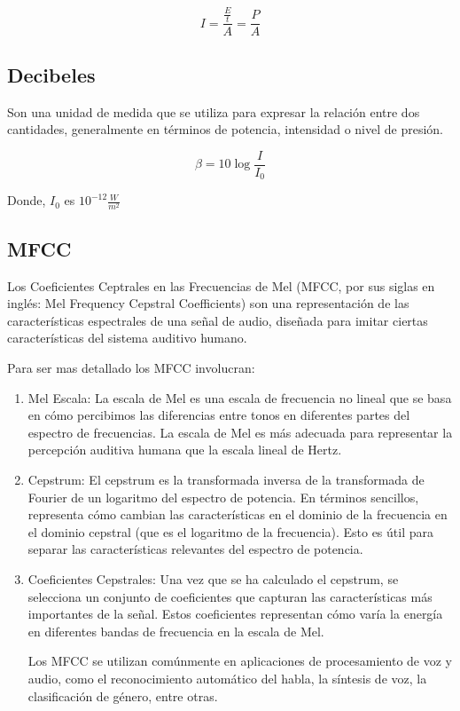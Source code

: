 \documentclass[letterpaper, 12pt]{article}
\begin{document}
\begin{equation}
	I = \frac{\frac{E}{t}}{A} = \frac{P}{A}
\end{equation}

\subsection*{Decibeles}

Son una unidad de medida que se utiliza para expresar la
relación entre dos cantidades, generalmente en términos de
potencia, intensidad o nivel de presión.

\begin{equation}
	\beta = 10 \log \frac{I}{I_{0}}
\end{equation}

Donde, $I_{0}$ es $10^{-12} \frac{W}{m^{2}}$

\subsection*{MFCC~\cite{mfcc}}

Los Coeficientes Ceptrales en las Frecuencias de Mel (MFCC,
por sus siglas en inglés: Mel Frequency Cepstral
Coefficients) son una representación de las características
espectrales de una señal de audio, diseñada para imitar
ciertas características del sistema auditivo humano.

Para ser mas detallado los MFCC involucran:

\begin{enumerate}
	\item Mel Escala: La escala de Mel es una escala de frecuencia no
	      lineal que se basa en cómo percibimos las diferencias entre
	      tonos en diferentes partes del espectro de frecuencias. La
	      escala de Mel es más adecuada para representar la
	      percepción auditiva humana que la escala lineal de Hertz.

	\item Cepstrum: El cepstrum es la transformada inversa de la
	      transformada de Fourier de un logaritmo del espectro de
	      potencia. En términos sencillos, representa cómo cambian
	      las características en el dominio de la frecuencia en el
	      dominio cepstral (que es el logaritmo de la frecuencia).
	      Esto es útil para separar las características relevantes
	      del espectro de potencia.

	\item Coeficientes Cepstrales: Una vez que se ha calculado el
	      cepstrum, se selecciona un conjunto de coeficientes que
	      capturan las características más importantes de la señal.
	      Estos coeficientes representan cómo varía la energía en
	      diferentes bandas de frecuencia en la escala de Mel.

	      Los MFCC se utilizan comúnmente en aplicaciones de
	      procesamiento de voz y audio, como el reconocimiento
	      automático del habla, la síntesis de voz, la clasificación
	      de género, entre otras.
\end{enumerate}
\end{document}
